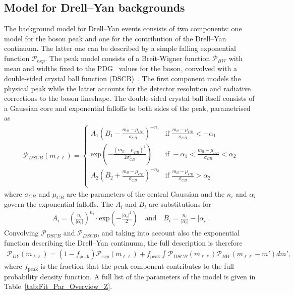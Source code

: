 \subsection{Model for Drell--Yan backgrounds}
\label{sec:Zmodel}
The background model for Drell--Yan events consists of two components: one model for the \Z boson peak and one for the contribution of the Drell--Yan continuum. The latter one can be described by a simple falling exponential function $\mathcal{P}_{exp}$. The peak model consists of a Breit-Wigner function $\mathcal{P}_{BW}$ with mean and widths fixed to the PDG~\cite{PDG} values for the \Z boson, convolved with a double-sided crystal ball function (DSCB)~\cite{Crystal}. The first component models the physical peak while the latter accounts for the detector resolution and radiative corrections to the \Z boson lineshape. The double-sided crystal ball itself consists of a Gaussian core and exponential falloffs to both sides of the peak, parametrised as
\begin{eqnarray*}
\mathcal{P}_{DSCB}(m_{\ell\ell}) = \begin{cases} A_{1} (B_{1}-\frac{m_{ll}-\mu_{CB}}{\sigma_{CB}})^{-n_{1}} &\mbox{if } \frac{m_{ll}-\mu_{CB}}{\sigma_{CB}}<-\alpha_{1} \\
\textrm{exp}\left(-\frac{(m_{ll}-\mu_{CB})^2}{2\sigma_{CB}^2}\right) &\mbox{if } -\alpha_{1}<\frac{m_{ll}-\mu_{CB}}{\sigma_{CB}}<\alpha_{2} \\
A_{2} (B_{2}+\frac{m_{ll}-\mu_{CB}}{\sigma_{CB}})^{-n_{2}} &\mbox{if } \frac{m_{ll}-\mu_{CB}}{\sigma_{CB}}>\alpha_{2} \\
\end{cases}
\end{eqnarray*}
where $\sigma_{CB}$ and $\mu_{CB}$ are the parameters of the central Gaussian and the $n_i$ and $\alpha_i$ govern the exponential falloffs. The $A_i$ and $B_i$ are substitutions for
\begin{eqnarray*}
A_{i} = \left(\frac{n_{i}}{|\alpha_{i}|}\right)^{n_{i}} \cdot \textrm{exp}\left(-\frac{|\alpha_{i}|^2}{2}\right) \quad \textrm{and}\quad B_{i} = \frac{n_{i}}{|\alpha_{i}|}-|\alpha_{i}| .
\end{eqnarray*}
Convolving $\mathcal{P}_{DSCB}$ and $\mathcal{P}_{DSCB}$, and taking into account also the exponential function describing the Drell--Yan continuum, the full description is therefore 
\begin{eqnarray*}
\mathcal{P}_{DY} (m_{\ell\ell}) = (1-f_\text{peak})\mathcal{P}_{exp}(m_{\ell\ell})+ f_\text{peak}\int \mathcal{P}_{DSCB}(m_{\ell\ell})\mathcal{P}_{BW}(m_{\ell\ell}-m') dm',
\end{eqnarray*}
where $f_{\text{peak}}$ is the fraction that the peak component contributes to the full probability density function. A full list of the parameters of the model is given in Table~\ref{tab:Fit_Par_Overview_Z}.


